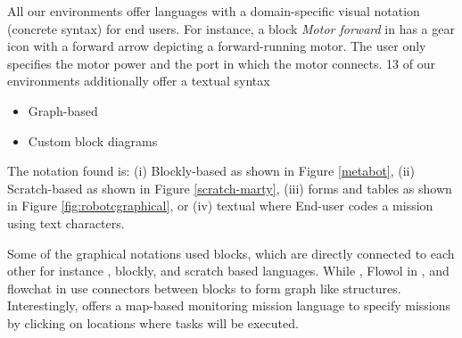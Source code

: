  All our environments offer languages with a domain-specific visual notation (concrete syntax) for end users. For instance, a block \emph{Motor forward} in \trik has a gear icon with a forward arrow depicting a forward-running motor. The user only specifies the motor power and the port in which the motor connects. 13 of our environments additionally offer a textual syntax


\begin{itemize}
	\item Graph-based
	\item Custom block diagrams
\end{itemize}

The notation found is: (i) Blockly-based as shown in Figure \ref{metabot}, (ii) Scratch-based as shown in Figure
	\ref{scratch-marty}, (iii) forms and tables as shown in Figure \ref{fig:robotcgraphical}, or (iv) textual where End-user codes a mission using text characters.


Some of the graphical notations used blocks, which are directly connected to each other for instance \trik, blockly, and scratch based languages. While \choregraphe, Flowol in \robotmesh, and flowchat in \picaxe use connectors between blocks to form graph like structures. %
Interestingly, \flyaq offers a map-based 
monitoring mission language to specify missions by clicking on locations where tasks will be executed. 

